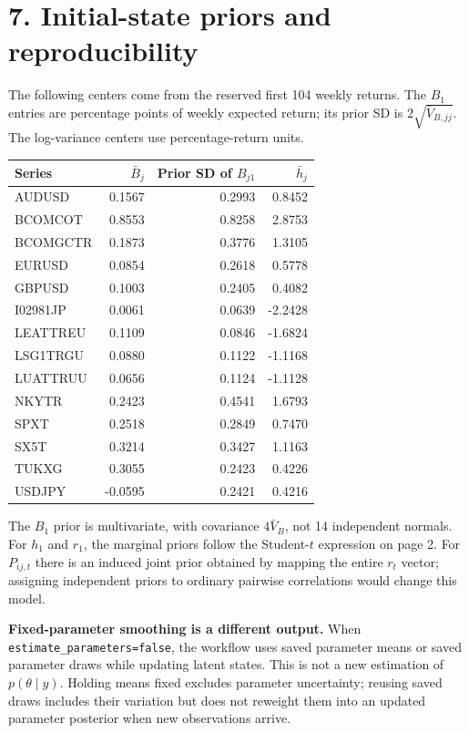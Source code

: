 \documentclass[10pt,a4paper]{article}
\begin{document}
\section*{7. Initial-state priors and reproducibility}
The following centers come from the reserved first 104 weekly returns.
The $B_1$ entries are percentage points of weekly expected return; its prior SD is
$2\sqrt{\bar V_{B,jj}}$. The log-variance centers use percentage-return units.
\begin{center}\small
\begin{tabular}{lrrr}\toprule
Series & $\bar B_j$ & Prior SD of $B_{j1}$ & $\bar h_j$\\\midrule
AUDUSD & 0.1567 & 0.2993 & 0.8452 \\
BCOMCOT & 0.8553 & 0.8258 & 2.8753 \\
BCOMGCTR & 0.1873 & 0.3776 & 1.3105 \\
EURUSD & 0.0854 & 0.2618 & 0.5778 \\
GBPUSD & 0.1003 & 0.2405 & 0.4082 \\
I02981JP & 0.0061 & 0.0639 & -2.2428 \\
LEATTREU & 0.1109 & 0.0846 & -1.6824 \\
LSG1TRGU & 0.0880 & 0.1122 & -1.1168 \\
LUATTRUU & 0.0656 & 0.1124 & -1.1128 \\
NKYTR & 0.2423 & 0.4541 & 1.6793 \\
SPXT & 0.2518 & 0.2849 & 0.7470 \\
SX5T & 0.3214 & 0.3427 & 1.1163 \\
TUKXG & 0.3055 & 0.2423 & 0.4226 \\
USDJPY & -0.0595 & 0.2421 & 0.4216 \\
\bottomrule\end{tabular}\end{center}
The $B_1$ prior is multivariate, with covariance $4\bar V_B$, not 14 independent normals.
For $h_1$ and $r_1$, the marginal priors follow the Student-$t$ expression on page 2.
For $P_{ij,t}$ there is an induced joint prior obtained by mapping the entire $r_t$ vector;
assigning independent priors to ordinary pairwise correlations would change this model.

\textbf{Fixed-parameter smoothing is a different output.} When
\texttt{estimate\_parameters=false}, the workflow uses saved parameter means or saved
parameter draws while updating latent states. This is not a new estimation of
$p(\theta\mid y)$. Holding means fixed excludes parameter uncertainty; reusing saved
draws includes their variation but does not reweight them into an updated parameter
posterior when new observations arrive.
\end{document}
